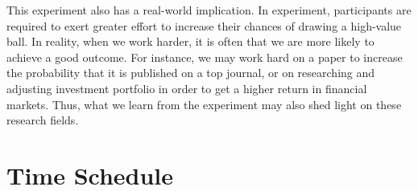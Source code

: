 \documentclass[
  12pt,
]{article}
\begin{document}
This experiment also has a real-world implication. In experiment,
participants are required to exert greater effort to increase their
chances of drawing a high-value ball. In reality, when we work harder,
it is often that we are more likely to achieve a good outcome. For
instance, we may work hard on a paper to increase the probability that
it is published on a top journal, or on researching and adjusting
investment portfolio in order to get a higher return in financial
markets. Thus, what we learn from the experiment may also shed light on
these research fields.

\hypertarget{time-schedule}{%
\section{Time Schedule}\label{time-schedule}}
\end{document}
